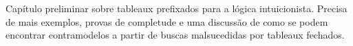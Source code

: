 \documentclass[../../../include/open-logic-chapter]{subfiles}
\begin{document}

\begin{editorial}
  Capítulo preliminar sobre tableaux prefixados para a lógica intuicionista. Precisa de mais
  exemplos, provas de completude e uma discussão de como se podem encontrar
  contramodelos a partir de buscas malsucedidas por tableaux fechados.
\end{editorial}


\OLEndChapterHook
\end{document}
